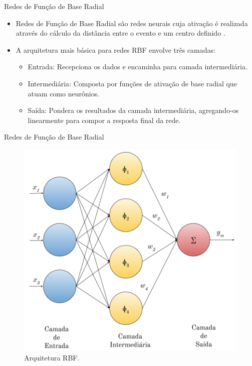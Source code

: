 \documentclass[10pt]{beamer}
\begin{document}
\begin{frame}{Redes de Função de Base Radial}
    \begin{itemize}
        \item<1 -> \alert{Redes de Função de Base Radial} são redes neurais cuja ativação é realizada através do cálculo da distância entre o evento e um centro definido \cite{Braga:RedesNeuraisTeoriaAplicacoes}.
        \item<1 -> A arquitetura mais básica para redes RBF envolve três camadas:
        \begin{itemize}
            \item<1 -> \alert{Entrada}: Recepciona os dados e encaminha para camada intermediária.
            \item<1 -> \alert{Intermediária}: Composta por funções de ativação de base radial que atuam como neurônios.
            \item<1 -> \alert{Saída}: Pondera os resultados da camada intermediária, agregando-os linearmente para compor a resposta final da rede.
        \end{itemize}
      \end{itemize}
\end{frame}

\begin{frame}{Redes de Função de Base Radial}
    \begin{figure}[H]
    \begin{center}
        \includegraphics[scale=0.63]{imagens/rbf_arq.png}
        \caption{Arquitetura RBF.}
        \label{fig:rbg_arq}
    \end{center}
    \end{figure}
\end{frame}
\end{document}
